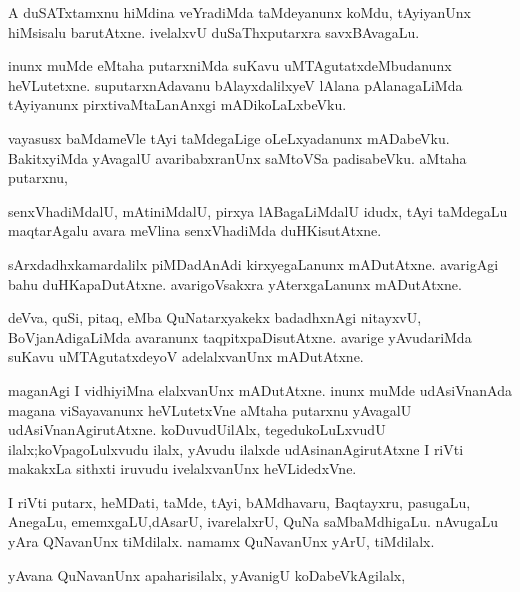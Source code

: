 \documentclass{article}
\begin{document}
\begin{mn}
A duSATxtamxnu hiMdina veYradiMda taMdeyanunx koMdu, tAyiyanUnx hiMsisalu 
barutAtxne.  ivelalxvU duSaThxputarxra savxBAvagaLu.
\end{mn}

\begin{mn}
inunx muMde eMtaha putarxniMda suKavu uMTAgutatxdeMbudanunx heVLutetxne. 
suputarxnAdavanu bAlayxdalilxyeV lAlana pAlanagaLiMda tAyiyanunx  
pirxtivaMtaLanAnxgi mADikoLaLxbeVku.
\end{mn}

\begin{mn}
vayasusx baMdameVle tAyi taMdegaLige oLeLxyadanunx mADabeVku. BakitxyiMda 
yAvagalU avaribabxranUnx saMtoVSa padisabeVku. aMtaha putarxnu, 
\end{mn}

\begin{mn}
senxVhadiMdalU, mAtiniMdalU, pirxya lABagaLiMdalU idudx, tAyi taMdegaLu 
maqtarAgalu avara meVlina senxVhadiMda duHKisutAtxne.
\end{mn}

\begin{mn}
sArxdadhxkamardalilx piMDadAnAdi kirxyegaLanunx mADutAtxne. avarigAgi 
bahu duHKapaDutAtxne. avarigoVsakxra yAterxgaLanunx mADutAtxne. 
\end{mn}

\begin{mn}
deVva, quSi, pitaq, eMba QuNatarxyakekx badadhxnAgi nitayxvU, BoVjanAdigaLiMda 
avaranunx taqpitxpaDisutAtxne. avarige yAvudariMda suKavu uMTAgutatxdeyoV 
adelalxvanUnx mADutAtxne. 
\end{mn}

\begin{mn}
maganAgi I vidhiyiMna elalxvanUnx mADutAtxne. inunx muMde udAsiVnanAda  
magana viSayavanunx heVLutetxVne aMtaha putarxnu yAvagalU udAsiVnanAgirutAtxne. 
 koDuvudUilAlx, tegedukoLuLxvudU ilalx;koVpagoLulxvudu ilalx, yAvudu ilalxde
 udAsinanAgirutAtxne I riVti makakxLa sithxti iruvudu ivelalxvanUnx heVLidedxVne.
\end{mn}

\begin{mn}
I riVti putarx, heMDati, taMde, tAyi, bAMdhavaru, Baqtayxru, pasugaLu, 
AnegaLu, ememxgaLU,dAsarU, ivarelalxrU, QuNa saMbaMdhigaLu. nAvugaLu yAra
 QNavanUnx tiMdilalx.  namamx QuNavanUnx yArU, tiMdilalx.  
\end{mn}

\begin{mn}
yAvana QuNavanUnx apaharisilalx, yAvanigU koDabeVkAgilalx,
\end{mn}
\end{document}
